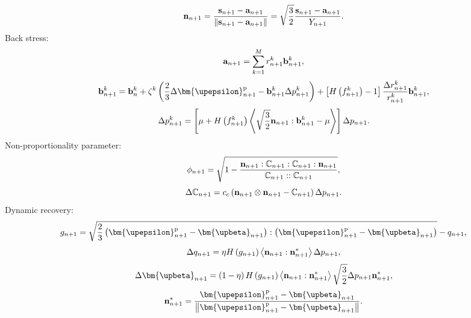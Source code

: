 \begin{equation}
\label{Equ:nn+1}
{{\bf{n}}_{n + 1}} = \frac{{{{\bf{s}}_{n + 1}} - {{\bf{a}}_{n + 1}}}}{{\left\| {{{\bf{s}}_{n + 1}} - {{\bf{a}}_{n + 1}}} \right\|}} = \sqrt {\frac{3}{2}} \frac{{{{\bf{s}}_{n + 1}} - {{\bf{a}}_{n + 1}}}}{{{Y_{n + 1}}}}.
\end{equation}
Back stress:
\begin{equation}
\label{Equ:an+1}
{{\bf{a}}_{n + 1}} = \sum\limits_{k = 1}^M {r_{n + 1}^k{\bf{b}}_{n + 1}^k},
\end{equation}
\begin{equation}
{{\bf{b}}_{n + 1}^k = {\bf{b}}_n^k + {\zeta ^k}\left( {\frac{2}{3}\Delta {\bm{\upepsilon }}_{n + 1}^{\rm{p}} - {\bf{b}}_{n + 1}^k\Delta p_{n + 1}^k} \right) + \left[ {H\left( {f_{n + 1}^k} \right) - 1} \right]{\frac{{\Delta r_{n + 1}^k}}{{r_{n + 1}^k}}{\bf{b}}_{n + 1}^k}},
\end{equation}
\begin{equation}
\Delta p_{n + 1}^k = \left[ {\mu  + H\left( {f_{n + 1}^k} \right)\left\langle {\sqrt {\frac{3}{2}} {{\bf{n}}_{n + 1}}:{\bf{b}}_{n + 1}^k - \mu } \right\rangle } \right]\Delta {p_{n + 1}}.
\end{equation}
Non-proportionality parameter:
\begin{equation}
{\phi _{n + 1}} = \sqrt {1 - \frac{{{{\bf{n}}_{n + 1}}:{\mathbb{C}_{n + 1}}:{\mathbb{C}_{n + 1}}:{{\bf{n}}_{n + 1}}}}{{{\mathbb{C}_{n + 1}}::{\mathbb{C}_{n + 1}}}}},
\end{equation}
\begin{equation}
\Delta {\mathbb{C}_{n + 1}} = {c_c}\left( {{{\bf{n}}_{n + 1}} \otimes {{\bf{n}}_{n + 1}} - {\mathbb{C}_{n + 1}}} \right)\Delta {p_{n + 1}}.
\end{equation}
Dynamic recovery:
\begin{equation}
{g_{n + 1}} = \sqrt {\frac{2}{3}\left( {{\bm{\upepsilon }}_{n + 1}^{\rm{p}} - {{\bm{\upbeta }}_{n + 1}}} \right):\left( {{\bm{\upepsilon }}_{n + 1}^{\rm{p}} - {{\bm{\upbeta }}_{n + 1}}} \right)}  - {q_{n + 1}},
\end{equation}
\begin{equation}
\Delta {q_{n + 1}} = \eta H\left( {{g_{n + 1}}} \right)\left\langle {{{\bf{n}}_{n + 1}}:{\bf{n}}_{n + 1}^*} \right\rangle \Delta {p_{n + 1}},
\end{equation}
\begin{equation}
\Delta {{\bm{\upbeta }}_{n + 1}} = \left( {1 - \eta } \right)H\left( {{g_{n + 1}}} \right)\left\langle {{{\bf{n}}_{n + 1}}:{\bf{n}}_{n + 1}^*} \right\rangle \sqrt {\frac{3}{2}} \Delta {p_{n + 1}}{\bf{n}}_{n + 1}^*,
\end{equation}
\begin{equation}
{\bf{n}}_{n + 1}^* = \frac{{{\bm{\upepsilon }}_{n + 1}^{\rm{p}} - {{\bm{\upbeta }}_{n + 1}}}}{{\left\| {{\bm{\upepsilon }}_{n + 1}^{\rm{p}} - {{\bm{\upbeta }}_{n + 1}}} \right\|}}.
\end{equation}

